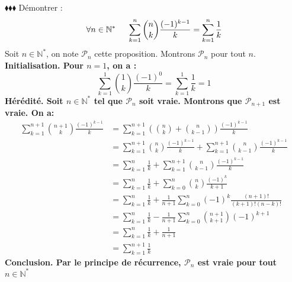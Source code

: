 \documentclass[11pt]{article}
\begin{document}
\begin{exercice}{$\blacklozenge\blacklozenge\blacklozenge$}{}
    Démontrer :
    \begin{equation*}
        \forall{n\in\mathbb{N}^*}\hspace{0.5cm}\sum^n_{k=1}{\binom{n}{k}\frac{(-1)^{k-1}}{k}}=\sum^n_{k=1}{\frac{1}{k}}
    \end{equation*}
    \tcblower
    Soit $n\in\mathbb{N}^*$, on note $\mathcal{P}_n$ cette proposition. Montrons $\mathcal{P}_n$ pour tout $n$.\\
    \bf{Initialisation}. Pour $n=1$, on a :
    \begin{equation*}
        \sum^1_{k=1}{\binom{1}{k}\frac{(-1)^0}{k}}=\sum^1_{k=1}{\frac{1}{k}}=1
    \end{equation*}
    \bf{Hérédité}. Soit $n\in\mathbb{N}^*$ tel que $\mathcal{P}_n$ soit vraie. Montrons que $\mathcal{P}_{n+1}$ est vraie. On a:
    \begin{align*}
        \sum^{n+1}_{k=1}{\binom{n+1}{k}\frac{(-1)^{k-1}}{k}}
        &=\sum^{n+1}_{k=1}{\left(\binom{n}{k}+\binom{n}{k-1}\right)\frac{(-1)^{k-1}}{k}}\\
        &=\sum^{n+1}_{k=1}{\binom{n}{k}\frac{(-1)^{k-1}}{k}}+\sum^{n+1}_{k=1}{\binom{n}{k-1}\frac{(-1)^{k-1}}{k}}\\
        &=\sum^n_{k=1}{\frac{1}{k}}+\sum^{n+1}_{k=1}{\binom{n}{k-1}\frac{(-1)^{k-1}}{k}}\\
        &=\sum^n_{k=1}{\frac{1}{k}}+\sum^{n}_{k=0}{\binom{n}{k}\frac{(-1)^k}{k+1}}\\
        &=\sum^n_{k=1}{\frac{1}{k}}+\frac{1}{n+1}\sum^n_{k=0}{(-1)^k\frac{(n+1)!}{(k+1)!(n-k)!}}\\
        &=\sum^n_{k=1}{\frac{1}{k}}-\frac{1}{n+1}\sum^n_{k=0}{\binom{n+1}{k+1}(-1)^{k+1}}\\
        &=\sum^n_{k=1}{\frac{1}{k}}+\frac{1}{n+1}\\
        &=\sum^{n+1}_{k=1}{\frac{1}{k}}
    \end{align*}
    \bf{Conclusion.} Par le principe de récurrence, $\mathcal{P}_n$ est vraie pour tout $n\in\mathbb{N}^*$
\end{exercice}
\end{document}
